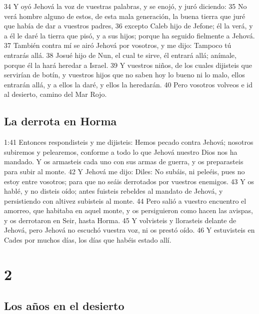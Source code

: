 34 Y oyó Jehová la voz de vuestras palabras, y se enojó, y juró diciendo:
35 No verá hombre alguno de estos, de esta mala generación, la buena tierra que juré que había de dar a vuestros padres,
36 excepto Caleb hijo de Jefone; él la verá, y a él le daré la tierra que pisó, y a sus hijos; porque ha seguido fielmente a Jehová.
37 También contra mí se airó Jehová por vosotros, y me dijo: Tampoco tú entrarás allá.
38 Josué hijo de Nun, el cual te sirve, él entrará allá; anímale, porque él la hará heredar a Israel.
39 Y vuestros niños, de los cuales dijisteis que servirían de botín, y vuestros hijos que no saben hoy lo bueno ni lo malo, ellos entrarán allá, y a ellos la daré, y ellos la heredarán.
40 Pero vosotros volveos e id al desierto, camino del Mar Rojo.

\section{La derrota en Horma }

1:41 Entonces respondisteis y me dijisteis: Hemos pecado contra Jehová; nosotros subiremos y pelearemos, conforme a todo lo que Jehová nuestro Dios nos ha mandado. Y os armasteis cada uno con sus armas de guerra, y os preparasteis para subir al monte.
42 Y Jehová me dijo: Diles: No subáis, ni peleéis, pues no estoy entre vosotros; para que no seáis derrotados por vuestros enemigos.
43 Y os hablé, y no disteis oído; antes fuisteis rebeldes al mandato de Jehová, y persistiendo con altivez subisteis al monte.
44 Pero salió a vuestro encuentro el amorreo, que habitaba en aquel monte, y os persiguieron como hacen las avispas, y os derrotaron en Seir, hasta Horma.
45 Y volvisteis y llorasteis delante de Jehová, pero Jehová no escuchó vuestra voz, ni os prestó oído.
46 Y estuvisteis en Cades por muchos días, los días que habéis estado allí.

\chapter{2}


\section{Los años en el desierto}


